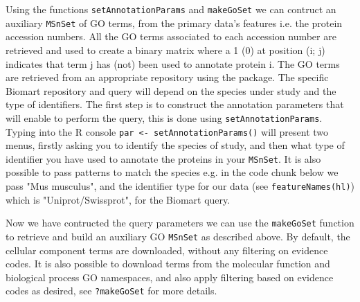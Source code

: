 Using the functions \texttt{setAnnotationParams} and
\texttt{makeGoSet} we can contruct an auxiliary \texttt{MSnSet} of GO
terms, from the primary data's features i.e. the protein accession
numbers. All the GO terms associated to each accession number are
retrieved and used to create a binary matrix where a 1 (0) at position
(i; j) indicates that term j has (not) been used to annotate protein
i. The GO terms are retrieved from an appropriate repository using the
 package. The specific Biomart repository and query
will depend on the species under study and the type of
identifiers. The first step is to construct the annotation parameters
that will enable to perform the query, this is done using
\texttt{setAnnotationParams}. Typing into the R console \texttt{par <-
  setAnnotationParams()} will present two menus, firstly asking you to
identify the species of study, and then what type of identifier you
have used to annotate the proteins in your \texttt{MSnSet}. It is also
possible to pass patterns to match the species e.g. in the code chunk
below we pass "Mus musculus", and the identifier type for our data
(see \texttt{featureNames(hl)}) which is "Uniprot/Swissprot", for the
Biomart query.

\begin{knitrout}
\color{fgcolor}\begin{kframe}
\begin{alltt}
 \hlkwb{<-} \hlstd{(} \hlstd{=} \hlstd{(}\hlstd{,}
                                      \hlstd{))}
\end{alltt}
\end{kframe}
\end{knitrout}

Now we have contructed the query parameters we can use the
\texttt{makeGoSet} function to retrieve and build an auxiliary GO
\texttt{MSnSet} as described above. By default, the cellular component
terms are downloaded, without any filtering on evidence codes. It is
also possible to download terms from the molecular function and
biological process GO namespaces, and also apply filtering based on
evidence codes as desired, see \texttt{?makeGoSet} for more details.

\begin{knitrout}
\color{fgcolor}\begin{kframe}
\begin{alltt}
 \hlkwb{<-}   
                   \hlstd{=} \hlstd{,}
                   \hlstd{=} \hlstd{)}
\end{alltt}
\end{kframe}
\end{knitrout}


